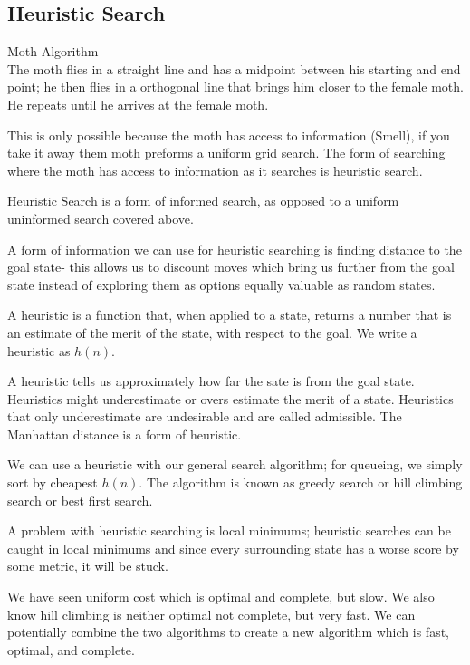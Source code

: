 \documentclass{chezarticle}
\begin{document}
\subsection{Heuristic Search}
\begin{algorithm}
Moth Algorithm\\
The moth flies in a straight line and has a midpoint between his starting and end point; he then flies in a orthogonal line that brings him closer to the female moth. He repeats until he arrives at the female moth. 
\end{algorithm}
This is only possible because the moth has access to information (Smell), if you take it away them moth preforms a uniform grid search. The form of searching where the moth has access to information as it searches is heuristic search.
\begin{definition}
Heuristic Search is a form of informed search, as opposed to a uniform uninformed search covered above.
\end{definition}
A form of information we can use for heuristic searching is finding distance to the goal state- this allows us to discount moves which bring us further from the goal state instead of exploring them as options equally valuable as random states.
\begin{definition}
A heuristic is a function that, when applied to a state, returns a number that is an estimate of the merit of the state, with respect to the goal. We write a heuristic as $h(n)$. 
\end{definition}
A heuristic tells us approximately how far the sate is from the goal state. Heuristics might underestimate or overs estimate the merit of a state. Heuristics that only underestimate are undesirable and are called admissible. The Manhattan distance is a form of heuristic.
\begin{example}
We can use a heuristic with our general search algorithm; for queueing, we simply sort by cheapest $h(n)$. The algorithm is known as greedy search or hill climbing search or best first search. 
\end{example}
A problem with heuristic searching is local minimums; heuristic searches can be caught in local minimums and since every surrounding state has a worse score by some metric, it will be stuck. 
\begin{claim}
We have seen uniform cost which is optimal and complete, but slow. We also know hill climbing is neither optimal not complete, but very fast. We can potentially combine the two algorithms to create a new algorithm which is fast, optimal, and complete.
\end{claim}
\end{document}
